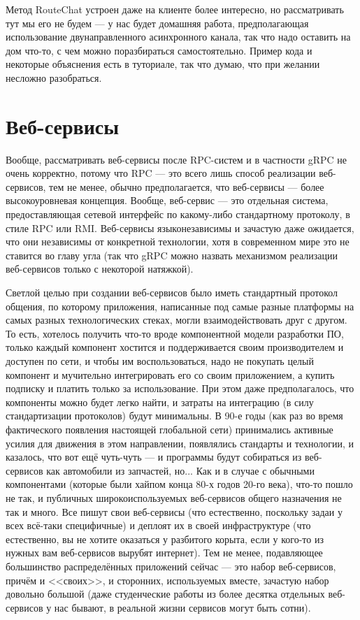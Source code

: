 \documentclass{../../text-style}
\begin{document}
Метод RouteChat устроен даже на клиенте более интересно, но рассматривать тут мы его не будем --- у нас будет домашняя работа, предполагающая использование двунаправленного асинхронного канала, так что надо оставить на дом что-то, с чем можно поразбираться самостоятельно. Пример кода и некоторые объяснения есть в туториале, так что думаю, что при желании несложно разобраться.

\section{Веб-сервисы}

Вообще, рассматривать веб-сервисы после RPC-систем и в частности gRPC не очень корректно, потому что RPC --- это всего лишь способ реализации веб-сервисов, тем не менее, обычно предполагается, что веб-сервисы --- более высокоуровневая концепция. Вообще, веб-сервис --- это отдельная система, предоставляющая сетевой интерфейс по какому-либо стандартному протоколу, в стиле RPC или RMI. Веб-сервисы языконезависимы и зачастую даже ожидается, что они независимы от конкретной технологии, хотя в современном мире это не ставится во главу угла (так что gRPC можно назвать механизмом реализации веб-сервисов только с некоторой натяжкой). 

Светлой целью при создании веб-сервисов было иметь стандартный протокол общения, по которому приложения, написанные под самые разные платформы на самых разных технологических стеках, могли взаимодействовать друг с другом. То есть, хотелось получить что-то вроде компонентной модели разработки ПО, только каждый компонент хостится и поддерживается своим производителем и доступен по сети, и чтобы им воспользоваться, надо не покупать целый компонент и мучительно интегрировать его со своим приложением, а купить подписку и платить только за использование. При этом даже предполагалось, что компоненты можно будет легко найти, и затраты на интеграцию (в силу стандартизации протоколов) будут минимальны. В 90-е годы (как раз во время фактического появления настоящей глобальной сети) принимались активные усилия для движения в этом направлении, появлялись стандарты и технологии, и казалось, что вот ещё чуть-чуть --- и программы будут собираться из веб-сервисов как автомобили из запчастей, но... Как и в случае с обычными компонентами (которые были хайпом конца 80-х годов 20-го века), что-то пошло не так, и публичных широкоиспользуемых веб-сервисов общего назначения не так и много. Все пишут свои веб-сервисы (что естественно, поскольку задаи у всех всё-таки специфичные) и деплоят их в своей инфраструктуре (что естественно, вы не хотите оказаться у разбитого корыта, если у кого-то из нужных вам веб-сервисов вырубят интернет). Тем не менее, подавляющее большинство распределённых приложений сейчас --- это набор веб-сервисов, причём и <<своих>>, и сторонних, используемых вместе, зачастую набор довольно большой (даже студенческие работы из более десятка отдельных веб-сервисов у нас бывают, в реальной жизни сервисов могут быть сотни).
\end{document}
